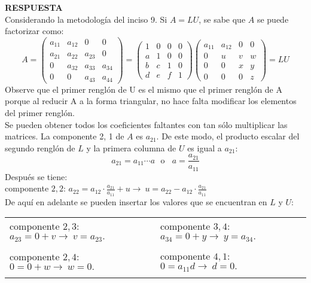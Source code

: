 \documentclass[11pt,letterpaper]{article}
\newcommand{\res}{\textbf{RESPUESTA}\\}
\begin{document}
\begin{enumerate}
\res
Considerando la metodología del inciso 9.
Si $A =LU$, se sabe que $A$ se puede factorizar como:
\begin{equation*}
A=\left(\begin{array}{cccc}
a_{11} & a_{12} &   0    &    0  \\
a_{21} & a_{22} & a_{23} &    0  \\
    0  & a_{32} & a_{33} & a_{34}\\
    0  &   0    & a_{43} & a_{44}
\end{array} \right)=
\left(\begin{array}{rrrr}
 1 &  0 &  0 & 0\\
 a &  1 &  0 & 0\\
 b &  c &  1 & 0\\
 d &  e &  f & 1
\end{array} \right) \left(\begin{array}{rrrr}
 a_{11} &  a_{12} & 0 & 0\\
 0 &  u &  v & w\\
 0 &  0 &  x & y\\
 0 &  0 &  0 & z
\end{array} \right)=LU
\end{equation*}
Observe que el primer renglón de U es el mismo que el primer renglón de A porque al reducir A a la forma triangular, no hace falta modificar los elementos del primer renglón.\\
Se pueden obtener todos los coeficientes faltantes con tan sólo multiplicar las matrices. La
componente 2, 1 de $A$ es $a_{21}$. De este modo, el producto escalar del segundo renglón de $L$ y la primera columna de $U$ es igual a $a_{21}$:
$$a_{21}=a_{11}\cdots a \ \ \ \text{o}  \ \ \ \ a=\frac{a_{21}}{a_{11}}$$
Después se tiene:\\
componente $2,2$: $a_{22}=a_{12}\cdot \frac{a_{21}}{a_{11}} +u \rightarrow \ u=a_{22}-a_{12}\cdot \left. \frac{a_{21}}{a_{11}}\right.$\\
De aquí en adelante se pueden insertar los valores que se encuentran en $L$ y $U$:
\begin{table}[H]
\centering
\begin{tabular}{l|l}
componente $2,3$: $a_{23}=0+v \rightarrow \ v=a_{23}.$ & componente $3,4$: $a_{34}=0+y \rightarrow \ y=a_{34}.$\\ \\
componente $2,4$: $0=0+w \rightarrow \ w=0.$ & componente $4,1$: $0=a_{11}d \rightarrow \ d=0.$\\ \\

\end{tabular}
\end{table}
\end{enumerate}
\end{document}

